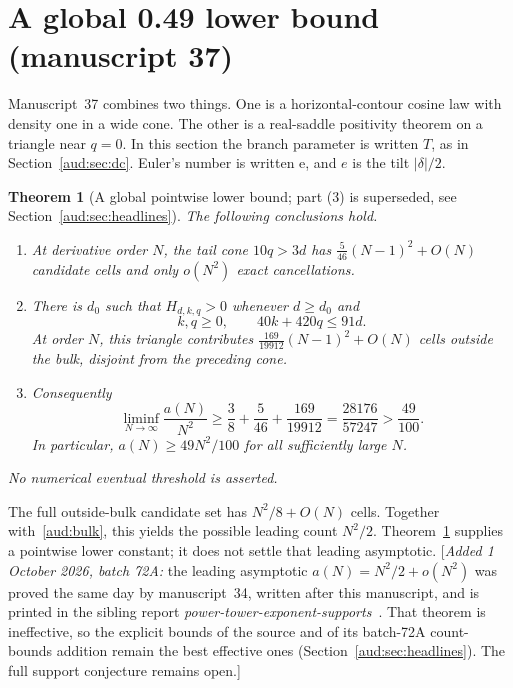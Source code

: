 \documentclass[11pt,a4paper]{article}
\numberwithin{equation}{section}
\newtheorem{theorem}{Theorem}[section]
\newcommand{\addednote}[1]{{\small[\textit{Added 1 October 2026, batch 72A:} #1]}}
\begin{document}
\section{A global 0.49 lower bound (manuscript 37)}\label{aud:sec:gh}
Manuscript~37 combines two things. One is a horizontal-contour cosine law with density one in a wide cone. The other is a real-saddle positivity theorem on a triangle near $q=0$. In this section the branch parameter is written $T$, as in Section~\ref{aud:sec:dc}. Euler's number is written $\mathrm e$, and $e$ is the tilt $|\delta|/2$.

\begin{theorem}[A global pointwise lower bound; part (3) is superseded, see Section~\ref{aud:sec:headlines}]\label{aud:gh:main}
The following conclusions hold.
\begin{enumerate}
\item At derivative order $N$, the tail cone $10q>3d$ has
$\frac5{46}(N-1)^2+O(N)$ candidate cells and only $o(N^2)$ exact cancellations.
\item There is $d_0$ such that $H_{d,k,q}>0$ whenever $d\ge d_0$ and
\[
 k,q\ge0,\qquad 40k+420q\le91d.
\]
At order $N$, this triangle contributes $\frac{169}{19912}(N-1)^2+O(N)$ cells outside the bulk, disjoint from the preceding cone.
\item Consequently
\begin{equation}\label{aud:gh:constant}
 \liminf_{N\to\infty}\frac{a(N)}{N^2}
 \ge\frac38+\frac5{46}+\frac{169}{19912}
 =\frac{28176}{57247}>\frac{49}{100}.
\end{equation}
In particular, $a(N)\ge49N^2/100$ for all sufficiently large $N$.
\end{enumerate}
No numerical eventual threshold is asserted.
\end{theorem}

The full outside-bulk candidate set has $N^2/8+O(N)$ cells. Together with~\eqref{aud:bulk}, this yields the possible leading count $N^2/2$. Theorem~\ref{aud:gh:main} supplies a pointwise lower constant; it does not settle that leading asymptotic. \addednote{the leading asymptotic $a(N)=N^2/2+o(N^2)$ was proved the same day by manuscript~34, written after this manuscript, and is printed in the sibling report \emph{power-tower-exponent-supports}~\cite{pte}. That theorem is ineffective, so the explicit bounds of the source and of its batch-72A count-bounds addition remain the best effective ones (Section~\ref{aud:sec:headlines}). The full support conjecture remains open.}
\end{document}
